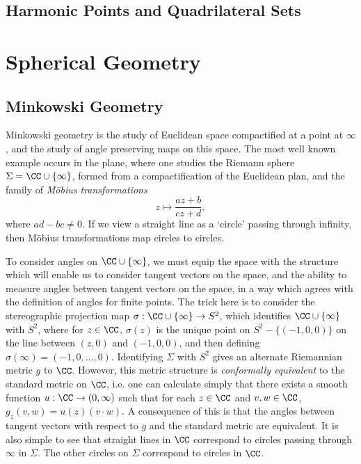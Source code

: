 \section{Harmonic Points and Quadrilateral Sets}





\chapter{Spherical Geometry}

\section{Minkowski Geometry}

Minkowski geometry is the study of Euclidean space compactified at a point at $\infty$, and the study of angle preserving maps on this space. The most well known example occurs in the plane, where one studies the Riemann sphere $\Sigma = \CC \cup \{ \infty \}$, formed from a compactification of the Euclidean plan, and the family of \emph{M\"{o}bius transformations}
%
\[ z \mapsto \frac{az + b}{cz + d}, \]
%
where $ad - bc \neq 0$. If we view a straight line as a `circle' passing through infinity, then M\"{o}bius transformations map circles to circles.

To consider angles on $\CC \cup \{ \infty \}$, we must equip the space with the structure which will enable us to consider tangent vectors on the space, and the ability to measure angles between tangent vectors on the space, in a way which agrees with the definition of angles for finite points. The trick here is to consider the stereographic projection map $\sigma: \CC \cup \{ \infty \} \to S^2$, which identifies $\CC \cup \{ \infty \}$ with $S^2$, where for $z \in \CC$, $\sigma(z)$ is the unique point on $S^2 - \{ (-1,0,0) \}$ on the line between $(z,0)$ and $(-1,0,0)$,
%
%
and then defining $\sigma(\infty) = (-1,0,\dots,0)$. Identifying $\Sigma$ with $S^2$ gives an alternate Riemannian metric $g$ to $\CC$. However, this metric structure is \emph{conformally equivalent} to the standard metric on $\CC$, i.e. one can calculate simply that there exists a smooth function $u: \CC \to (0,\infty)$ such that for each $z \in \CC$ and $v,w \in \CC$, $g_z(v,w) = u(z) (v \cdot w)$. A consequence of this is that the angles between tangent vectors with respect to $g$ and the standard metric are equivalent. It is also simple to see that straight lines in $\CC$ correspond to circles passing through $\infty$ in $\Sigma$. The other circles on $\Sigma$ correspond to circles in $\CC$.

